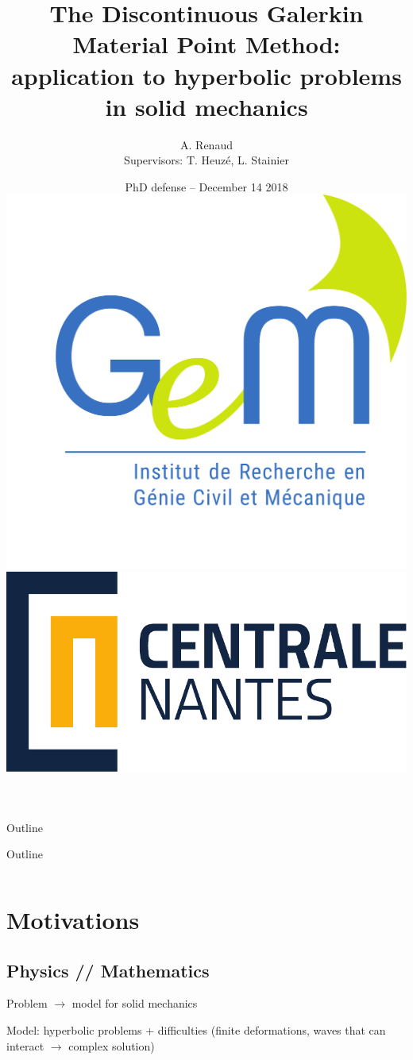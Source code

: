 \documentclass[11pt,aspectratio=169]{beamer}
\title[The Discontinuous Galerkin Material Point Method]
{\Large\bf  {The Discontinuous Galerkin Material Point Method: \\application to hyperbolic problems in solid mechanics}}
\date[]{
	\footnotesize{PhD defense} --
	December 14 2018 \\ \hspace*{7.cm}\includegraphics[trim = 0cm 4cm 0cm 0cm, clip,scale=0.1]{Logo_GEM.pdf} \hspace*{2.cm}\includegraphics[scale=0.25]{Logo_ECN.pdf}}%
\author{A. Renaud \\ Supervisors: T. Heuz\'e, L. Stainier}
\begin{document}
\begin{frame}[plain]
  \maketitle
\end{frame}

\begin{frame}[plain]{Outline}
  \tableofcontents%
\end{frame}
\begin{frame}[plain]{Outline}
  \begin{columns}
    \begin{column}{0.5\textwidth}
      \tableofcontents%
    \end{column}
    \begin{column}{0.5\textwidth}
      \tableofcontents%
    \end{column}
  \end{columns}
\end{frame}


\section{Motivations}

\subsection{Physics // Mathematics}
\begin{frame}
  Problem $\rightarrow$ model for solid mechanics

      
  Model: hyperbolic problems + difficulties (finite deformations, waves that can interact $\rightarrow$ complex solution)
\end{frame}
\end{document}
